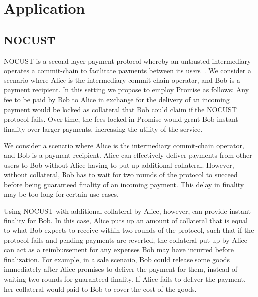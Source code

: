 \documentclass[runningheads]{llncs}
\newcommand{\sys}{Promise\xspace}
\newcommand{\toaza}[1]{\todo[linecolor=blue,backgroundcolor=blue!25,bordercolor=blue,inline,caption={}]{Todo for Alexei: #1}}
\begin{document}




\section{Application}
\label{sec:application}

\subsection{NOCUST}

NOCUST is a second-layer payment protocol whereby an untrusted intermediary operates a commit-chain to facilitate payments between its users~\cite{Khalil2019NOCUST}. We consider a scenario where Alice is the intermediary commit-chain operator, and Bob is a payment recipient. In this setting we propose to employ \sys as follows: Any fee to be paid by Bob to Alice in exchange for the delivery of an incoming payment would be locked as collateral that Bob could claim if the NOCUST protocol fails. Over time, the fees locked in \sys would grant Bob instant finality over larger payments, increasing the utility of the service.


We consider a scenario where Alice is the intermediary commit-chain operator, and Bob is a payment recipient. Alice can effectively deliver payments from other users to Bob without Alice having to put up additional collateral. However, without collateral, Bob has to wait for two rounds of the protocol to succeed before being guaranteed finality of an incoming payment. This delay in finality may be too long for certain use cases. 

Using NOCUST with additional collateral by Alice, however, can provide instant finality for Bob. In this case, Alice puts up an amount of collateral that is equal to what Bob expects to receive within two rounds of the protocol, such that if the protocol fails and pending payments are reverted, the collateral put up by Alice can act as a reimbursement for any expenses Bob may have incurred before finalization. For example, in a sale scenario, Bob could release some goods immediately after Alice promises to deliver the payment for them, instead of waiting two rounds for guaranteed finality. If Alice fails to deliver the payment, her collateral would paid to Bob to cover the cost of the goods.
\end{document}

